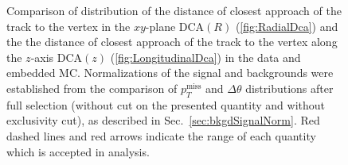 \begin{figure}[ht!]
\centering
\parbox{0.4725\textwidth}{
  \centering
  \begin{subfigure}[b]{\linewidth}{
                }
  \end{subfigure}
}%
\quad\quad%
\parbox{0.4725\textwidth}{%
  \centering
  \begin{subfigure}[b]{\linewidth}{
                }
  \end{subfigure}
}%
\caption[Comparison of distribution of $\textrm{DCA}(R)$ and $\textrm{DCA}(z)$ in the data and embedded MC]
{Comparison of distribution of the distance of closest approach of the track to the vertex in the $xy$-plane $\textrm{DCA}(R)$ (\ref{fig:RadialDca}) and the the distance of closest approach of the track to the vertex along the $z$-axis $\textrm{DCA}(z)$ (\ref{fig:LongitudinalDca}) in the data and embedded MC. Normalizations of the signal and backgrounds were established from the comparison of $p_{T}^{\textrm{miss}}$ and $\Delta\theta$ distributions after full selection (without cut on the presented quantity and without exclusivity cut), as described in Sec.~\ref{sec:bkgdSignalNorm}. Red dashed lines and red arrows indicate the range of each quantity which is accepted in analysis.}\label{fig:DCA}
\end{figure}
